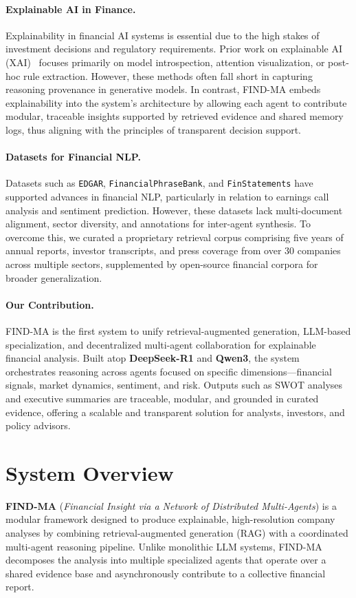 \documentclass[11pt]{article}
\newcommand{\findma}{\textsc{FIND-MA}}
\begin{document}
\paragraph{Explainable AI in Finance.}
Explainability in financial AI systems is essential due to the high stakes of investment decisions and regulatory requirements. Prior work on explainable AI (XAI)~\cite{arrieta2020explainable} focuses primarily on model introspection, attention visualization, or post-hoc rule extraction. However, these methods often fall short in capturing reasoning provenance in generative models. In contrast, \findma{} embeds explainability into the system’s architecture by allowing each agent to contribute modular, traceable insights supported by retrieved evidence and shared memory logs, thus aligning with the principles of transparent decision support.

\paragraph{Datasets for Financial NLP.}
Datasets such as \texttt{EDGAR}, \texttt{FinancialPhraseBank}, and \texttt{FinStatements} have supported advances in financial NLP, particularly in relation to earnings call analysis and sentiment prediction. However, these datasets lack multi-document alignment, sector diversity, and annotations for inter-agent synthesis. To overcome this, we curated a proprietary retrieval corpus comprising five years of annual reports, investor transcripts, and press coverage from over 30 companies across multiple sectors, supplemented by open-source financial corpora for broader generalization.

\paragraph{Our Contribution.}
\findma{} is the first system to unify retrieval-augmented generation, LLM-based specialization, and decentralized multi-agent collaboration for explainable financial analysis. Built atop \textbf{DeepSeek-R1} and \textbf{Qwen3}, the system orchestrates reasoning across agents focused on specific dimensions—financial signals, market dynamics, sentiment, and risk. Outputs such as SWOT analyses and executive summaries are traceable, modular, and grounded in curated evidence, offering a scalable and transparent solution for analysts, investors, and policy advisors.

\section{System Overview}
\label{sec:overview}
\textbf{\findma{}} (\textit{Financial Insight via a Network of Distributed Multi-Agents}) is a modular framework designed to produce explainable, high-resolution company analyses by combining retrieval-augmented generation (RAG) with a coordinated multi-agent reasoning pipeline. Unlike monolithic LLM systems, \findma{} decomposes the analysis into multiple specialized agents that operate over a shared evidence base and asynchronously contribute to a collective financial report.
\end{document}
